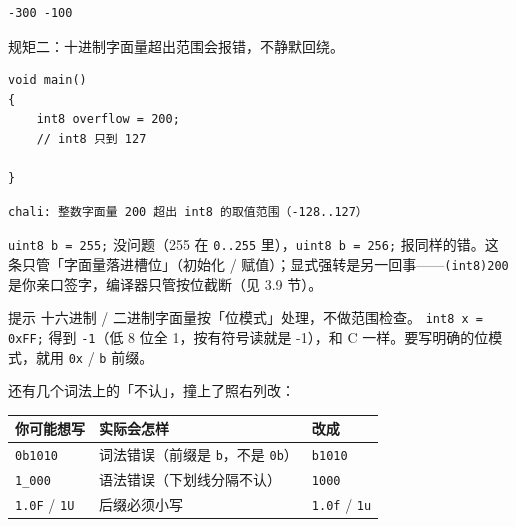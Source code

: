 \par
\medskip
\begin{lstlisting}[style=out]
-300 -100
\end{lstlisting}
\par
\medskip

规矩二：十进制字面量超出范围会报错，不静默回绕。

\par
\medskip
\begin{lstlisting}[style=chali]
void main()
{
    int8 overflow = 200;
    // int8 只到 127

}
\end{lstlisting}
\par
\medskip

\par
\medskip
\begin{lstlisting}[style=out]
chali: 整数字面量 200 超出 int8 的取值范围（-128..127）
\end{lstlisting}
\par
\medskip

\texttt{uint8 b =\allowbreak{} 255;} 没问题（255 在 \texttt{0.\allowbreak{}.\allowbreak{}255} 里），\texttt{uint8 b =\allowbreak{} 256;} 报同样的错。这条只管「字面量落进槽位」（初始化 / 赋值）；显式强转是另一回事——\texttt{(\allowbreak{}int8)\allowbreak{}200} 是你亲口签字，编译器只管按位截断（见 3.9 节）。

\begin{tip}{提示}
十六进制 / 二进制字面量按「位模式」处理，不做范围检查。 \texttt{int8 x =\allowbreak{} 0x\allowbreak{}FF;} 得到 \texttt{-1}（低 8 位全 1，按有符号读就是 -1），和 C 一样。要写明确的位模式，就用 \texttt{0x} / \texttt{b} 前缀。
\end{tip}

还有几个词法上的「不认」，撞上了照右列改：

\begin{center}
\begin{tabular}{lll}
\toprule
你可能想写 & 实际会怎样 & 改成 \\
\midrule
\texttt{0b1010} & 词法错误（前缀是 \texttt{b}，不是 \texttt{0b}） & \texttt{b1010} \\
\texttt{1\_000} & 语法错误（下划线分隔不认） & \texttt{1000} \\
\texttt{1.\allowbreak{}0F} / \texttt{1U} & 后缀必须小写 & \texttt{1.\allowbreak{}0f} / \texttt{1u} \\
\bottomrule
\end{tabular}
\end{center}

